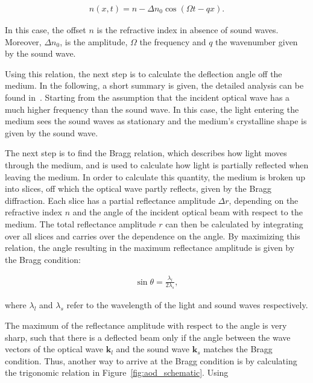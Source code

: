 \begin{align}
	n(x, t) = n - \Delta n_0 \cos{\left(\Omega t - q x\right)}.
\end{align}

In this case, the offset $n$ is the refractive index in absence of sound waves. Moreover, $\Delta n_0$, is the amplitude, $\Omega$ the frequency and $q$ the wavenumber given by the sound wave.

Using this relation, the next step is to calculate the deflection angle off the medium. In the following, a short summary is given, the detailed analysis can be found in~\cite{Saleh1991}. Starting from the assumption that the incident optical wave has a much higher frequency than the sound wave. In this case, the light entering the medium sees the sound waves as stationary and the medium's crystalline shape is given by the sound wave.

The next step is to find the Bragg relation, which describes how light moves through the medium, and is used to calculate how light is partially reflected when leaving the medium. In order to calculate this quantity, the medium is broken up into slices, off which the optical wave partly reflects, given by the Bragg diffraction. Each slice has a partial reflectance amplitude $\Delta r$, depending on the refractive index $n$ and the angle of the incident optical beam with respect to the medium. The total reflectance amplitude $r$ can then be calculated by integrating over all slices and carries over the dependence on the angle. By maximizing this relation, the angle resulting in the maximum reflectance amplitude is given by the Bragg condition:


\begin{align}
	\sin \theta = \frac{\lambda_l}{2 \lambda_s},
\end{align}

where $\lambda_l$ and $\lambda_s$ refer to the wavelength of the light and sound waves respectively.

The maximum of the reflectance amplitude with respect to the angle is very sharp, such that there is a deflected beam only if the angle between the wave vectors of the optical wave $\mathbf{k}_l$ and the sound wave $\mathbf{k}_s$ matches the Bragg condition. Thus, another way to arrive at the Bragg condition is by calculating the trigonomic relation in Figure~\ref{fig:aod_schematic}. Using

